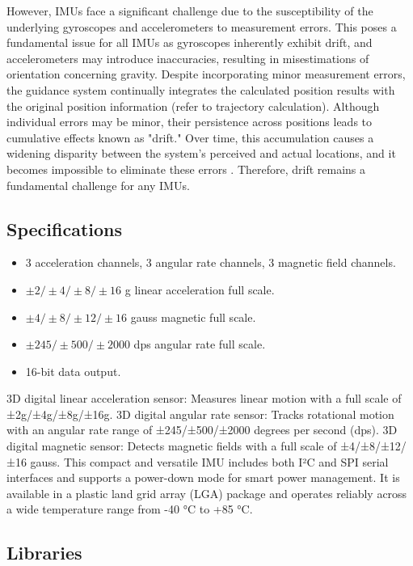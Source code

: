 However, IMUs face a significant challenge due to the susceptibility of the underlying gyroscopes and accelerometers to measurement errors. This poses a fundamental issue for all IMUs as gyroscopes inherently exhibit drift, and accelerometers may introduce inaccuracies, resulting in misestimations of orientation concerning gravity. Despite incorporating minor measurement errors, the guidance system continually integrates the calculated position results with the original position information (refer to trajectory calculation). Although individual errors may be minor, their persistence across positions leads to cumulative effects known as "drift." Over time, this accumulation causes a widening disparity between the system's perceived and actual locations, and it becomes impossible to eliminate these errors \cite{Harris:2023}. Therefore, drift remains a fundamental challenge for any IMUs.
\subsection{Specifications}
\begin{itemize}
	\item 3 acceleration channels, 3 angular rate channels, 3 magnetic field channels.
	\item $\pm2/\pm4/\pm8/\pm16$ g linear acceleration full scale.
	\item $\pm4/\pm8/\pm12/\pm16$ gauss magnetic full scale.
	\item $\pm245/\pm500/\pm2000$ dps angular rate full scale.
	\item 16-bit data output.
\end{itemize}

3D digital linear acceleration sensor: Measures linear motion with a full scale of ±2g/±4g/±8g/±16g.\newline
3D digital angular rate sensor: Tracks rotational motion with an angular rate range of ±245/±500/±2000 degrees per second (dps).\newline
3D digital magnetic sensor: Detects magnetic fields with a full scale of ±4/±8/±12/±16 gauss.\newline
This compact and versatile IMU includes both I²C and SPI serial interfaces and supports a power-down mode for smart power management. It is available in a plastic land grid array (LGA) package and operates reliably across a wide temperature range from -40 °C to +85 °C.

\subsection{Libraries}

